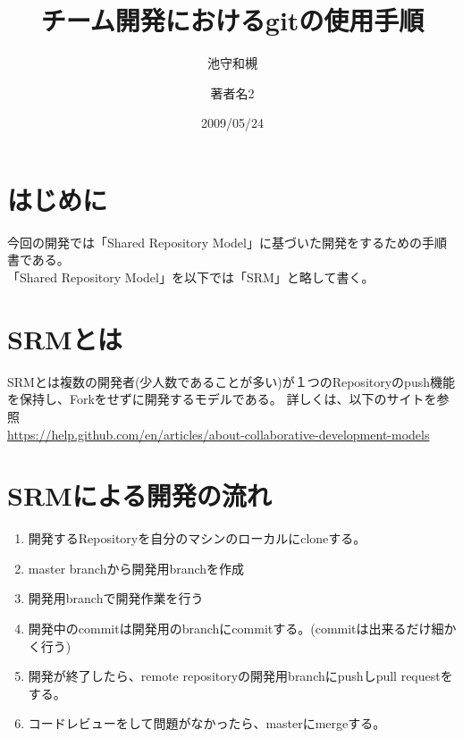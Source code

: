 \documentclass[dvipdfmx]{jsarticle}
\title {チーム開発におけるgitの使用手順}
\author{池守和槻 \and 著者名2}
\date{2009/05/24}
\begin{document}
  \maketitle
  \section{はじめに}
    今回の開発では「Shared Repository Model」に基づいた開発をするための手順書である。\\
    「Shared Repository Model」を以下では「SRM」と略して書く。\\


  \section{SRMとは}
    SRMとは複数の開発者(少人数であることが多い)が１つのRepositoryのpush機能を保持し、Forkをせずに開発するモデルである。
    詳しくは、以下のサイトを参照 \\
    \url{https://help.github.com/en/articles/about-collaborative-development-models}

  \section{SRMによる開発の流れ}
    \begin{enumerate}
      \item 開発するRepositoryを自分のマシンのローカルにcloneする。
      \item master branchから開発用branchを作成
      \item 開発用branchで開発作業を行う
      \item 開発中のcommitは開発用のbranchにcommitする。(commitは出来るだけ細かく行う)
      \item 開発が終了したら、remote repositoryの開発用branchにpushしpull requestをする。
      \item コードレビューをして問題がなかったら、masterにmergeする。
    \end{enumerate}
\end{document}

